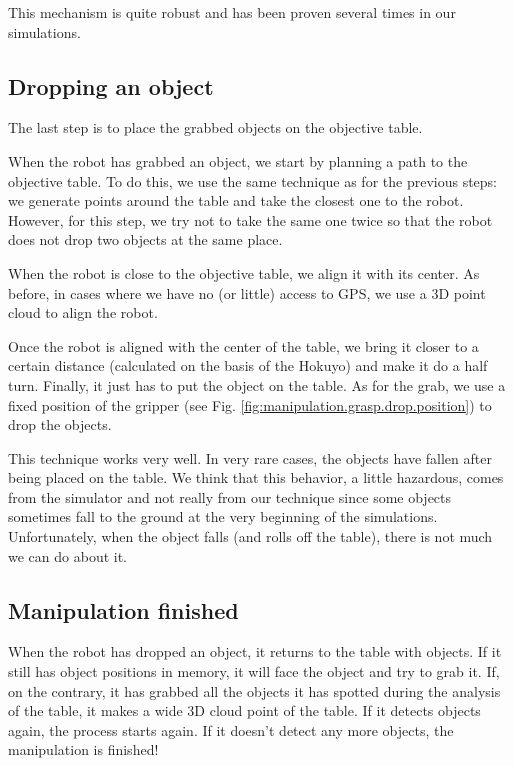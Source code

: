\documentclass[a4paper, 10pt, conference]{ieeeconf}
\begin{document}
    This mechanism is quite robust and has been proven several times in our simulations.
    
    \subsection{Dropping an object}
    
    The last step is to place the grabbed objects on the objective table.
    
    When the robot has grabbed an object, we start by planning a path to the objective table. To do this, we use the same technique as for the previous steps: we generate points around the table and take the closest one to the robot. However, for this step, we try not to take the same one twice so that the robot does not drop two objects at the same place.
    
    When the robot is close to the objective table, we align it with its center. As before, in cases where we have no (or little) access to GPS, we use a 3D point cloud to align the robot.
    
    Once the robot is aligned with the center of the table, we bring it closer to a certain distance (calculated on the basis of the Hokuyo) and make it do a half turn. Finally, it just has to put the object on the table. As for the grab, we use a fixed position of the gripper (see Fig. \ref{fig:manipulation.grasp.drop.position}) to drop the objects.
    
    This technique works very well. In very rare cases, the objects have fallen after being placed on the table. We think that this behavior, a little hazardous, comes from the simulator and not really from our technique since some objects sometimes fall to the ground at the very beginning of the simulations. Unfortunately, when the object falls (and rolls off the table), there is not much we can do about it.
    
    \subsection{Manipulation finished}
    
    When the robot has dropped an object, it returns to the table with objects. If it still has object positions in memory, it will face the object and try to grab it. If, on the contrary, it has grabbed all the objects it has spotted during the analysis of the table, it makes a wide 3D cloud point of the table. If it detects objects again, the process starts again. If it doesn't detect any more objects, the manipulation is finished!
    
\end{document}
